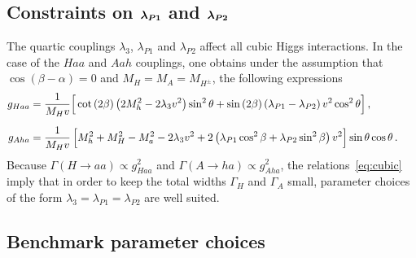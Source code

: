 \documentclass[a4paper, 11pt,notoc]{article}
\def\bm#1{\mbox{\boldmath$#1$\unboldmath}}
\begin{document}
\subsection*{Constraints on $\bm{\lambda_{P1}}$ and $\bm{\lambda_{P2}}$}

The quartic couplings $\lambda_3$, $\lambda_{P1}$ and $\lambda_{P2}$ affect all  cubic Higgs interactions. In the case of the $Haa$ and $Aah$ couplings, one obtains under the assumption that  $\cos (\beta-\alpha) = 0$ and $M_H = M_A = M_{H^\pm}$, the following expressions~\cite{Bauer:2017ota}
\begin{eqnarray} \label{eq:cubic}
\begin{split}
g_{Haa}   & = \frac{1}{M_H v}  \Big [  \cot \left ( 2 \beta \right) \left (  2 M_h^2 - 2 \lambda_3 v^2 \right )  \sin^2 \theta + \sin \left ( 2 \beta \right ) \left (\lambda_{P1}-\lambda_{P2} \right ) v^2 \cos^2 \theta \Big  ] \,, \\[2mm]
g_{Aha}   & = \frac{1}{M_H v} \, \Big [ M_h^2  + M_H^2   -  M_a^2 - 2 \lambda_3 v^2 + 2 \left (  \lambda_{P1} \cos^2 \beta + \lambda_{P2} \sin^2 \beta  \right ) v^2 \Big ] \sin \theta \cos \theta \,. \hspace{6mm}
\end{split}
\end{eqnarray}
Because $\Gamma (H \to aa) \propto g_{Haa}^2$ and $\Gamma (A \to ha) \propto g_{Aha}^2$, the relations~\eqref{eq:cubic} imply  that  in order to keep the total widths $\Gamma_H$ and $\Gamma_A$ small, parameter choices of the form $\lambda_3 = \lambda_{P1} = \lambda_{P2}$ are well suited. 

\subsection*{Benchmark parameter choices}
\end{document}
